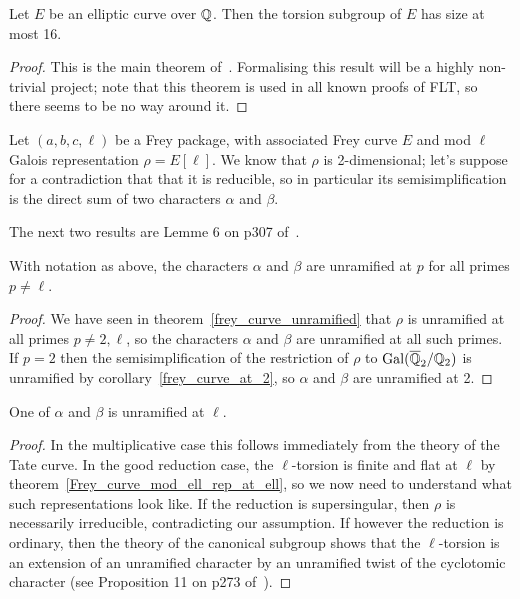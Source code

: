 \begin{theorem}\label{mazur} Let $E$ be an elliptic curve over $\mathbb{Q}$. Then the torsion subgroup
  of $E$ has size at most 16.
\end{theorem}
\begin{proof}
  This is the main theorem of~\cite{mazur-torsion}. Formalising this result will be a highly
  non-trivial project; note that this theorem is used in all known proofs of FLT, so there
  seems to be no way around it.
\end{proof}

Let $(a,b,c,\ell)$ be a Frey package, with associated Frey curve $E$ and mod $\ell$ Galois
 representation $\rho=E[\ell]$. We know that $\rho$ is 2-dimensional; let's suppose for a 
 contradiction that that it is
 reducible, so in particular its semisimplification is the direct sum of two characters $\alpha$
 and $\beta$.

 The next two results are Lemme 6 on p307 of~\cite{serrepropgal}.

\begin{theorem}\label{Frey_characters_are_unramified} With notation as above, the characters
  $\alpha$ and $\beta$ are unramified at $p$ for all primes $p\not=\ell$.
\end{theorem}
\begin{proof} We have seen in theorem~\ref{frey_curve_unramified} that $\rho$ is unramified at all 
  primes $p\not=2,\ell$, so the
  characters $\alpha$ and $\beta$ are unramified at all such primes. If $p=2$ then the
  semisimplification of the restriction of $\rho$ to $\operatorname{Gal}(\overline{\mathbb{Q}}_2/\mathbb{Q}_2)$ is unramified
  by corollary~\ref{frey_curve_at_2}, so $\alpha$ and $\beta$ are unramified at 2.
\end{proof}

\begin{theorem}\label{Frey_characters_at_ell} One of $\alpha$ and $\beta$ is unramified at $\ell$.
\end{theorem}
\begin{proof}
In the multiplicative case this follows immediately from the theory of the Tate curve.
In the good reduction case, the $\ell$-torsion is finite and flat at $\ell$ by theorem~\ref{Frey_curve_mod_ell_rep_at_ell}, so we now need to understand what such representations
look like. If the reduction is supersingular, then $\rho$ is necessarily irreducible,
contradicting our assumption. If however the reduction is ordinary, then the theory of the
canonical subgroup shows that the $\ell$-torsion is an extension of an unramified character by
an unramified twist of the cyclotomic character (see Proposition 11 on p273 of~\cite{serrepropgal}).
\end{proof}

